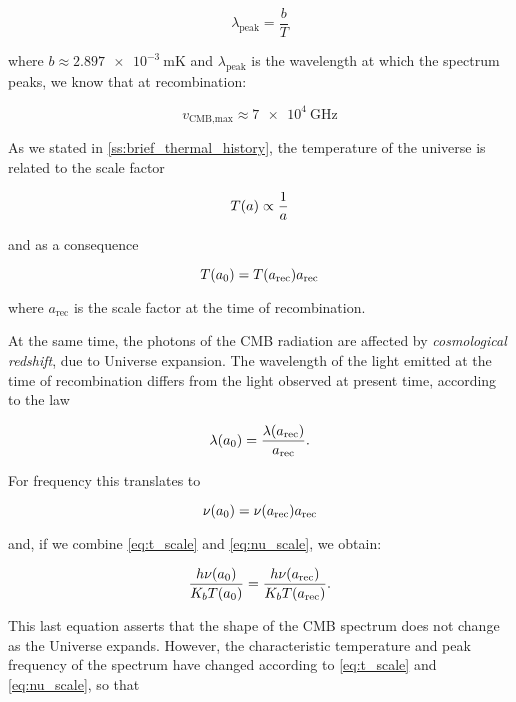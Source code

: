 \begin{equation}
        \lambda_{\text{peak}} = \frac{b}{T}
\end{equation}

where $b \approx \SI{2.897e-3}{\meter\kelvin}$ and
$\lambda_{\text{peak}}$ is the wavelength at which the spectrum
peaks, we know that at recombination:

\begin{equation}
        v_{\text{CMB,max}} \approx \SI{7e4}{\giga\hertz}
\end{equation}

As we stated in \autoref{ss:brief_thermal_history}, the temperature of the
universe is related to the scale factor

\begin{equation}
        T\qty(a) \propto \frac{1}{a}
\end{equation}

and as a consequence

\begin{equation}
        T\qty(a_0) = T\qty(a_{\text{rec}}) a_{\text{rec}}
        \label{eq:t_scale}
\end{equation}

where $a_{\text{rec}}$ is the scale factor at the time of recombination.

At the same time, the photons of the CMB radiation are affected by \emph{cosmological
redshift}, due to Universe expansion. The wavelength of the light emitted
at the time of recombination differs from the light observed at present
time, according to the law

\begin{equation}
        \lambda\qty(a_0) = \frac{\lambda\qty(a_{\text{rec}})}{a_{\text{rec}}}.
\end{equation}

For frequency this translates to

\begin{equation}
        \nu\qty(a_0) = \nu\qty(a_{\text{rec}}) a_{\text{rec}}
        \label{eq:nu_scale}
\end{equation}

and, if we combine \autoref{eq:t_scale} and \autoref{eq:nu_scale}, we
obtain:

\begin{equation}
        \frac{h \nu\qty(a_0)}{K_b T\qty(a_0)} =
        \frac{h \nu\qty(a_{\text{rec}})}{K_b T\qty(a_{\text{rec}})}.
\end{equation}

This last equation asserts that the shape of the CMB spectrum does not
change as the Universe expands. However, the characteristic temperature and
peak frequency of the spectrum have changed according to
\autoref{eq:t_scale} and \autoref{eq:nu_scale}, so that

